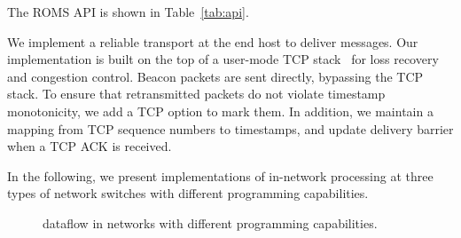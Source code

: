 The ROMS API is shown in Table~\ref{tab:api}.

We implement a reliable transport at the end host to deliver messages. Our implementation is built on the top of a user-mode TCP stack~\cite{dunkels2001design} for loss recovery and congestion control. Beacon packets are sent directly, bypassing the TCP stack. To ensure that retransmitted packets do not violate timestamp monotonicity, we add a TCP option to mark them. In addition, we maintain a mapping from TCP sequence numbers to timestamps, and update delivery barrier when a TCP ACK is received.

In the following, we present implementations of in-network processing at three types of network switches with different programming capabilities. 

\begin{figure}[thbp]
	\centering
	\hspace{0.04\textwidth}
	\hspace{0.04\textwidth}
    \vspace{-10pt}
	\caption{\sys dataflow in networks with different programming capabilities.}
	\label{fig:impl}
	\vspace{-10pt}
\end{figure}

